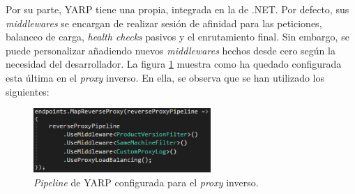 \documentclass[11pt,spanish,listoffigures]{tfgetsinf}
\begin{document}
Por su parte, YARP tiene una propia, integrada en la de .NET. Por defecto, sus \emph{middlewares} se encargan de realizar sesión de afinidad para las peticiones, balanceo de carga, \emph{health checks} pasivos y el enrutamiento final. Sin embargo, se puede personalizar añadiendo nuevos \emph{middlewares} hechos desde cero según la necesidad del desarrollador. La figura \ref{pipelineYARP_imagen} muestra como ha quedado configurada esta última en el \emph{proxy} inverso. En ella, se observa que se han utilizado los siguientes:

\begin{figure}[ht]
\centering
\includegraphics[width=0.6\textwidth]{imagenes/pipelineYARP}
\caption{\emph{Pipeline} de YARP configurada para el \emph{proxy} inverso.}
	\label{pipelineYARP_imagen}
\end{figure}
\end{document}

